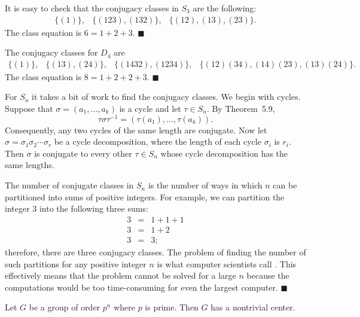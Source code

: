  
\medskip
 
 
It is easy to check that  the conjugacy classes in $S_3$ are the
following: 
$$
\begin{array}{ccc}
\{ (1) \},  & \{ (123), (132) \}, & \{(12), (13), (23) \}.
\end{array}
$$
The class equation is $6 = 1+2+3$.
\hspace{\fill} $\blacksquare$
 
 
\medskip
 
 
The conjugacy classes for $D_4$ are
$$
\begin{array}{cccc}
\{ (1) \}, &
\{ (13), (24) \}, &
\{ (1432), (1234) \}, &
\{ (12)(34), (14)(23), (13)(24) \}.
\end{array}
$$
The class equation is $8 = 1 + 2 + 2 + 3$.
\hspace{\fill} $\blacksquare$
 
 
\medskip
 
 
For $S_n$ it takes a bit of work to find the conjugacy classes.  We
begin with cycles.  Suppose that $\sigma = ( a_1, \ldots, a_k)$ is a
cycle and let $\tau \in S_n$. By Theorem~5.9,
$$
\tau \sigma \tau^{-1} = ( \tau( a_1), \ldots, \tau(a_k)).
$$
Consequently, any two cycles of the same length are conjugate. Now let
$\sigma = \sigma_1 \sigma_2 \cdots \sigma_r$ be a cycle decomposition,
where the length of each cycle $\sigma_i$ is $r_i$. Then $\sigma$ is
conjugate to every other $\tau \in S_n$ whose cycle decomposition has
the same lengths. 
 
 
The number of conjugate classes in $S_n$ is the number of ways in
which $n$ can be partitioned into sums of positive integers. For
example, we can partition the integer 3 into the following three sums: 
\begin{eqnarray*}
3 & = & 1 + 1 + 1 \\
3 & = & 1 + 2 \\
3 & = & 3;
\end{eqnarray*}
therefore, there are three conjugacy classes. The problem of finding
the number of such partitions for any positive integer $n$ is what
computer scientists call .  This effectively means
that the problem cannot be solved for a large $n$ because the
computations would be too time-consuming for even the largest computer. 
\hspace{\fill} $\blacksquare$
 
 
\medskip
 
 
\begin{theorem}
Let $G$ be a group of order $p^n$ where $p$ is prime. Then $G$ has a
nontrivial center. 
\end{theorem}
 
